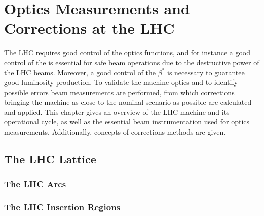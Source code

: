 
\chapter{Optics Measurements and Corrections at the LHC} %

\label{Chapter2} %


The LHC requires good control of the optics functions, and for instance a good control of the \betafunctions is essential for safe beam operations due to the destructive power of the LHC beams.
Moreover, a good control of the \(\beta^{\ast}\) is necessary to guarantee good luminosity production.
To validate the machine optics and to identify possible errors beam measurements are performed, from which corrections bringing the machine as close to the nominal scenario as possible are calculated and applied. 
This chapter gives an overview of the LHC machine and its operational cycle, as well as the essential beam instrumentation used for optics measurements.
Additionally, concepts of corrections methods are given.




\section{The LHC Lattice}


\subsection{The LHC Arcs}

\subsection{The LHC Insertion Regions}

